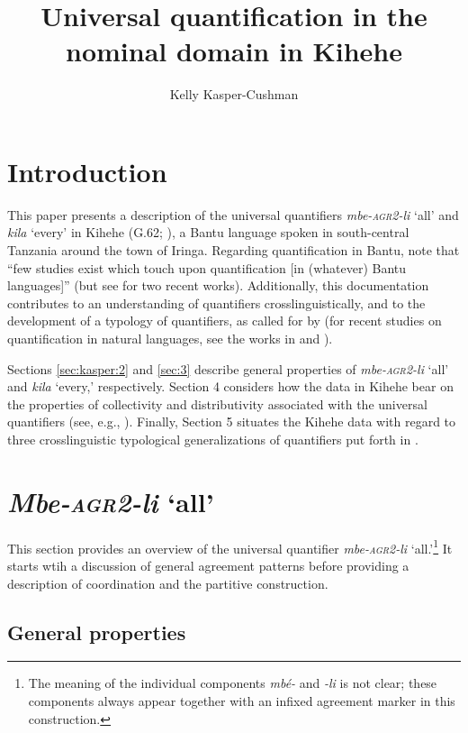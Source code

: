 \documentclass[output=paper,modfonts,nonflat]{langsci/langscibook}
\title{Universal quantification in the nominal domain in Kihehe}
\author{Kelly Kasper-Cushman\affiliation{Indiana University}}
\begin{document}
\maketitle

\section{Introduction}

This paper presents a description of the universal quantifiers \textit{mbe-\textsc{agr2}-li} `all' and \textit{kila} `every' in Kihehe (G.62; \citealt{maho09}), a Bantu language spoken in south-central Tanzania around the town of Iringa.
Regarding quantification in Bantu, \citealt[p. 383]{zerbian08} note that ``few studies exist which touch upon quantification [in (whatever) Bantu languages]'' (but see \citealt{landman16, landmanip} for two recent works). Additionally, this documentation contributes to an understanding of quantifiers crosslinguistically, and to the development of a typology of quantifiers, as called for by \cite{matthewson13} (for recent studies on quantification in natural languages, see the works in \citealt{gil13, keenan12, matthewson08} and \citealt{paperno17}).

Sections \ref{sec:kasper:2} and \ref{sec:3} describe general properties of \textit{mbe-\textsc{agr2}-li} `all' and \textit{kila} `every,' respectively. Section 4 considers how the data in Kihehe bear on the properties of collectivity and distributivity associated with the universal quantifiers (see, e.g., \citet{szabolcsi10}). Finally, Section 5 situates the Kihehe data with regard to three crosslinguistic typological generalizations of quantifiers put forth in \citealt{matthewson13}. 


\section{\emph{Mbe-\textsc{agr2}-li} `all'}

This section provides an overview of the universal quantifier \emph{mbe-\textsc{agr2}-li} `all.'\footnote{The meaning of the individual components \textit{mbé-} and \textit{-li} is not clear; these components always appear together with an infixed agreement marker in this construction.} It starts wtih a discussion of general agreement patterns before providing a description of coordination and the partitive construction. 

\subsection{General properties}
\end{document}
